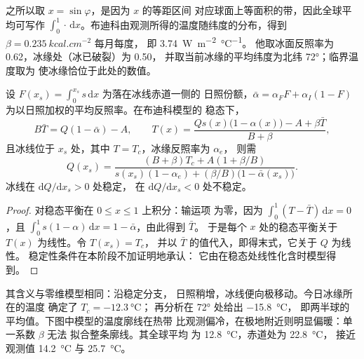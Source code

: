之所以取 $x = \sin\varphi$，是因为 $x$ 的等距区间
对应球面上等面积的带，因此全球平均可写作 $\int_0^1\cdot\,\mathrm
dx$。布迪科由观测所得的温度随纬度的分布，得到 $\beta = \qty{0.235}{kcal.cm^{-2}}$ 每月每度，
即 \qty{3.74}{W.m^{-2}.\celsius^{-1}}。
他取冰面反照率为 0.62，冰缘处（冰已破裂）为 0.50，
并取当前冰缘的平均纬度为北纬
\ang{72}；临界温度取为
使冰缘恰位于此处的数值。

\begin{proposition}[布迪科模型的冰线]\label{prop:b3:climate-models:iceline}
设 $F(x_s) = \int_0^{x_s}s\,\mathrm dx$ 为落在冰线赤道一侧的
日照份额，$\bar\alpha = \alpha_FF + \alpha_I(1 -
F)$ 为以日照加权的平均反照率。在布迪科模型的
稳态下，
\[
B\bar T = Q(1 - \bar\alpha) - A, \qquad
T(x) = \frac{Qs(x)\big(1 - \alpha(x)\big) - A + \beta\bar T}{B + \beta} ,
\]
且冰线位于 $x_s$ 处，其中 $T = T_c$，冰缘反照率为 $\alpha_e$，
则需
\[
Q(x_s) = \frac{(B + \beta)T_c + A(1 + \beta/B)}{s(x_s)(1 - \alpha_e) +
(\beta/B)\big(1 - \bar\alpha(x_s)\big)} .
\]
冰线在 $\mathrm dQ/\mathrm dx_s > 0$ 处稳定，
在 $\mathrm dQ/\mathrm dx_s < 0$ 处不稳定。
\end{proposition}

\begin{proof}
对稳态平衡在 $0 \le x \le 1$ 上积分：输运项
为零，因为 $\int_0^1(T - \bar T)\,\mathrm dx = 0$，且 $\int_0^1
s(1 - \alpha)\,\mathrm dx = 1 - \bar\alpha$，由此得到 $\bar T$。
于是每个 $x$ 处的稳态平衡关于 $T(x)$ 为线性。令 $T(x_s) = T_c$，
并以 $\bar T$ 的值代入，即得末式，它关于 $Q$ 为线性。
稳定性条件在本阶段不加证明地承认：
它由在稳态处线性化含时模型得到。
\end{proof}

其含义与零维模型相同：沿稳定分支，
日照稍增，冰线便向极移动。今日冰缘所在的温度
确定了 $T_c = \qty{-12.3}{\celsius}$；
再分析在 \ang{72} 处给出 \qty{-15.8}{\celsius}，
即两半球的平均值。下图中模型的温度廓线在热带
比观测偏冷，在极地附近则明显偏暖：单一系数 $\beta$ 无法
拟合整条廓线。其全球平均
为 \qty{12.8}{\celsius}，赤道处为 \qty{22.8}{\celsius}，
接近观测值 \qty{14.2}{\celsius} 与 \qty{25.7}{\celsius}。

